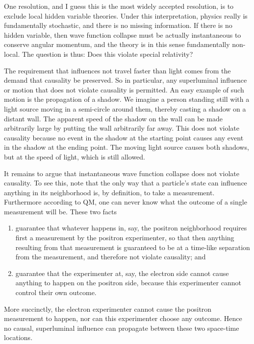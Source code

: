 One resolution, and I guess this is the most widely accepted resolution,
is to exclude local hidden variable theories. Under this interpretation,
physics really is fundamentally stochastic, and there is no missing
information. If there is no hidden variable, then wave function collapse
must be actually instantaneous to conserve angular momentum, and the
theory is in this sense fundamentally non-local. The question is thus:
Does this violate special relativity?

The requirement that influences not travel faster than light comes from
the demand that causality be preserved. So in particular, any
superluminal influence or motion that does not violate causality is
permitted. An easy example of such motion is the propagation of a shadow.
We imagine a person standing still with a light source moving in a semi-circle
around them, thereby casting a shadow on a distant wall. The apparent
speed of the shadow on the wall can be made arbitrarily large by putting
the wall arbitrarily far away. This does not violate causality because
no event in the shadow at the starting point causes any event in the
shadow at the ending point. The moving light source causes both shadows,
but at the speed of light, which is still allowed.

It remains to argue that instantaneous wave function collapse does not violate
causality. To see this, note that the only way that a particle's state
can influence anything in its neighborhood is, by definition, to take a
measurement. Furthermore according to QM, one can never know what the
outcome of a single measurement will be. These two facts
\begin{enumerate}
  \item guarantee that whatever happens in, say, the positron neighborhood
        requires first a measurement by the positron experimenter, so that
        then anything resulting from that measurement is guaranteed to
        be at a time-like separation from the measurement, and therefore 
        not violate causality; and
  \item guarantee that the experimenter at, say, the electron side cannot
        cause anything to happen on the positron side, because this
        experimenter cannot control their own outcome.
\end{enumerate}
More succinctly, the electron experimenter cannot cause the positron
measurement to happen, nor can this experimenter choose any outcome.
Hence no causal, superluminal influence can propagate between 
these two space-time locations.


